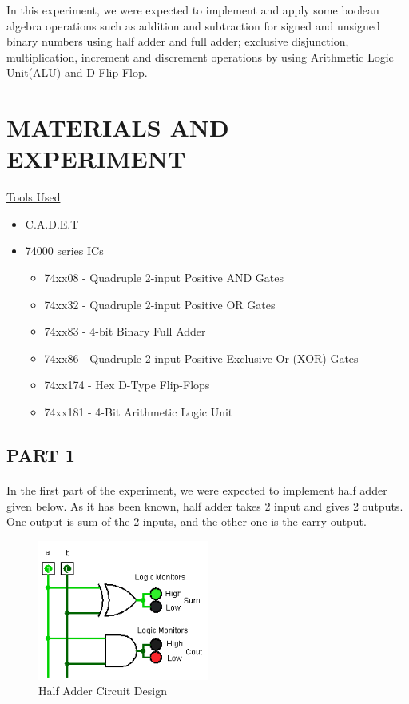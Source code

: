 \documentclass[pdftex,12pt,a4paper]{article}
\begin{document}
In this experiment, we were expected to implement and apply some boolean algebra operations such as addition and subtraction for signed and unsigned binary numbers using half adder and full adder; exclusive disjunction, multiplication, increment and discrement operations by using Arithmetic Logic Unit(ALU) and D Flip-Flop.

\section{MATERIALS AND EXPERIMENT}
\underline{Tools Used}
\begin{itemize}
    \item C.A.D.E.T
    \item 74000 series ICs
    \begin{itemize}
        \item 74xx08 - Quadruple 2-input Positive AND Gates
        \item 74xx32 - Quadruple 2-input Positive OR Gates   
        \item 74xx83 - 4-bit Binary Full Adder
        \item 74xx86 - Quadruple 2-input Positive Exclusive Or (XOR) Gates
        \item 74xx174 - Hex D-Type Flip-Flops
        \item 74xx181 - 4-Bit Arithmetic Logic Unit
    \end{itemize}
\end{itemize}
\clearpage
\newpage
\subsection{PART 1}
\paragraph{}
In the first part of the experiment, we were expected to implement half adder given below. As it has been known, half adder takes 2 input and gives 2 outputs. One output is sum of the 2 inputs, and the other one is the carry output.


\begin{figure}[!h]
	\centering
	\includegraphics[width=0.5\textwidth]{part1.png}	
	\caption{Half Adder Circuit Design}
	\label{Half Adder}
\end{figure}
\end{document}
